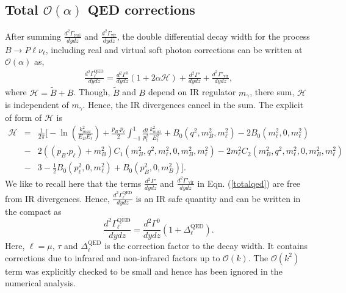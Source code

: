 \documentclass[a4paper,11pt]{article}
\begin{document}
	  	\subsection{Total $\mathcal{O}(\alpha)$ QED corrections}
	  	\label{subsec3}
	    	After summing $\frac{d^{2} \Gamma_{\text{real}}}{dy dz}$ and $\frac{d^{2} \Gamma_{\text{vir}}}{dy dz}$, the double differential decay width for the process $B \rightarrow P \ell \nu_\ell$, including real and virtual soft photon corrections can be written at $\mathcal{O}(\alpha)$ as,
	    		\begin{eqnarray}
		 	\frac{d^{2}\Gamma_{\ell}^{\text{QED}}}{dy dz}=\frac{d^{2}\Gamma^{0}}{dy dz}\left(1 + 2\alpha \mathcal{H}\right)+ \frac{d^{2}\Gamma'}{dy dz}+\frac{d^{2} \Gamma'_{\text{vir}}}{dy dz},
		 	\label{totalqed}
		 	\end{eqnarray}
		 	where $\mathcal{H}=\tilde{B}+B$. Though, $\tilde{B}$ and $B$ depend on IR regulator $m_{\gamma}$, there sum, $\mathcal{H}$ is independent of $m_{\gamma}$. Hence, the IR divergences cancel in the sum. The explicit of form of $\mathcal{H}$ is 
		 	\begin{eqnarray}
		 	\mathcal{H}&=&\frac{1}{2\pi}\Bigg[ -\ln\left(\frac{k_{max}^2}{E_B E_{\ell}}\right)+\frac{p_B.p_{\ell}}{2}\int_{-1}^{1} \frac{dt}{p_t^2}\frac{k_{max}^2}{E_t^2}+ B_{0}(q^{2},m_{B}^{2},m_{\ell}^{2})- 2  B_{0}(m_{\ell}^{2},0,m_{\ell}^{2}) \nonumber\\&-&2\left((p_{B}.p_{\ell})+ m_{B}^{2}\right)C_{1}(m_{B}^{2},q^{2},m_{\ell}^{2},0,m_{B}^{2},m_{\ell}^{2}) -2 m_{\ell}^{2}C_{2}(m_{B}^{2},q^{2},m_{\ell}^{2},0,m_{B}^{2},m_{\ell}^{2})\nonumber\\&-&3-\frac{1}{2}B_{0}(p_{\ell}^{2},0,m_{\ell}^{2})+B_{0}(p_{B}^{2},0,m_{B}^{2})\Big].
		 	\label{H}
		 	\end{eqnarray}
		 	We like to recall here that the terms $\frac{d^{2}\Gamma'}{dy dz}$ and $\frac{d^{2} \Gamma'_{\text{vir}}}{dy dz}$ in Eqn. (\ref{totalqed}) are free from IR divergences. Hence, $\frac{d^{2}\Gamma_{\ell}^{\text{QED}}}{dy dz}$ is an IR safe quantity and can be written in the compact as
	        \begin{equation}
	    	\frac{d^{2}\Gamma_{\ell}^{\text{QED}}}{dy dz}=\frac{d^{2}\Gamma^{0}}{dy dz}\left(1 + \Delta_{\ell}^{\text{QED}} \right) .
	    	\label{delta}
	    	\end{equation}
	    Here, $\ell=\mu$, $\tau$ and $\Delta_{\ell}^{\text{QED}}$ is the correction factor to the decay width. It contains corrections due to infrared and non-infrared factors up to $\mathcal{O}(k)$. The $\mathcal{O}(k^{2})$ term was explicitly checked to be small and hence has been ignored in the numerical analysis.\\
\end{document}
